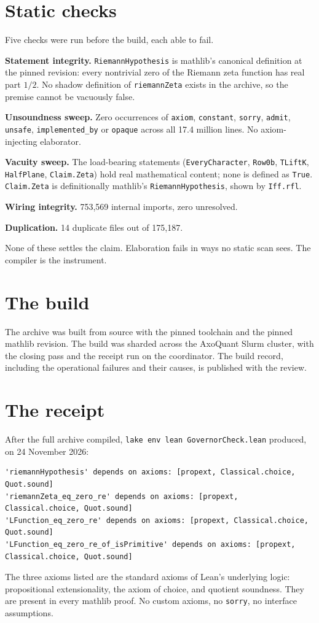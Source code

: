 \documentclass[11pt]{article}
\begin{document}
\section{Static checks}
Five checks were run before the build, each able to fail.

\textbf{Statement integrity.} \texttt{RiemannHypothesis} is mathlib's canonical definition at the pinned revision: every nontrivial zero of the Riemann zeta function has real part $1/2$. No shadow definition of \texttt{riemannZeta} exists in the archive, so the premise cannot be vacuously false.

\textbf{Unsoundness sweep.} Zero occurrences of \texttt{axiom}, \texttt{constant}, \texttt{sorry}, \texttt{admit}, \texttt{unsafe}, \texttt{implemented\_by} or \texttt{opaque} across all 17.4 million lines. No axiom-injecting elaborator.

\textbf{Vacuity sweep.} The load-bearing statements (\texttt{EveryCharacter}, \texttt{Row0b}, \texttt{TLiftK}, \texttt{HalfPlane}, \texttt{Claim.Zeta}) hold real mathematical content; none is defined as \texttt{True}. \texttt{Claim.Zeta} is definitionally mathlib's \texttt{RiemannHypothesis}, shown by \texttt{Iff.rfl}.

\textbf{Wiring integrity.} 753,569 internal imports, zero unresolved.

\textbf{Duplication.} 14 duplicate files out of 175,187.

None of these settles the claim. Elaboration fails in ways no static scan sees. The compiler is the instrument.

\section{The build}
The archive was built from source with the pinned toolchain and the pinned mathlib revision. The build was sharded across the AxoQuant Slurm cluster, with the closing pass and the receipt run on the coordinator. The build record, including the operational failures and their causes, is published with the review.

\section{The receipt}
After the full archive compiled, \texttt{lake env lean GovernorCheck.lean} produced, on 24 November 2026:
\begin{verbatim}
'riemannHypothesis' depends on axioms: [propext, Classical.choice, Quot.sound]
'riemannZeta_eq_zero_re' depends on axioms: [propext, Classical.choice, Quot.sound]
'LFunction_eq_zero_re' depends on axioms: [propext, Classical.choice, Quot.sound]
'LFunction_eq_zero_re_of_isPrimitive' depends on axioms: [propext, Classical.choice, Quot.sound]
\end{verbatim}
The three axioms listed are the standard axioms of Lean's underlying logic: propositional extensionality, the axiom of choice, and quotient soundness. They are present in every mathlib proof. No custom axioms, no \texttt{sorry}, no interface assumptions.
\end{document}
